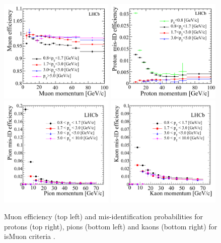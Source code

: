 \begin{figure}[tbp] 
  \centering    
  \includegraphics[width=0.49\textwidth]{./Figs/LHC_LHCb/hidef_Fig41topleft.png}
  \includegraphics[width=0.49\textwidth]{./Figs/LHC_LHCb/hidef_Fig41topright.png}
  \includegraphics[width=0.49\textwidth]{./Figs/LHC_LHCb/hidef_Fig41bottomleft.png}
  \includegraphics[width=0.49\textwidth]{./Figs/LHC_LHCb/hidef_Fig41bottomright.png}
  \caption{Muon efficiency (top left) and mis-identification probabilities for protons (top right), pions (bottom left) and kaons (bottom right) for isMuon criteria \cite{Archilli:2013npa}. }
  \label{fig:isMuon_efficiency}
\end{figure}




